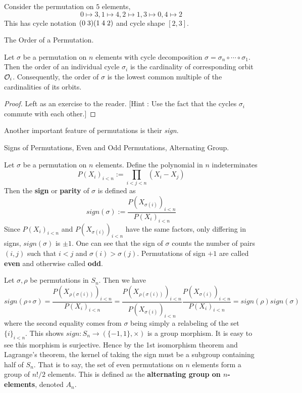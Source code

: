 \documentclass[../../book.tex]{subfiles}
\begin{document}
\begin{eg}
    
    Consider the permutation on $5$ elements, \[
        0 \mapsto 3, 1 \mapsto 4, 2 \mapsto 1, 3 \mapsto 0, 4 \mapsto 2
    \]
    This has cycle notation $(0\thickspace3) (1\thickspace4\thickspace2)$
    and cycle shape $[2, 3]$. 
    
\end{eg}

\begin{thm} The Order of a Permutation. 
    
    Let $\sigma$ be a permutation on $n$ elements 
    with cycle decomposition $\sigma = \sigma_n \circ \cdots \circ \sigma_1$. 
    Then the order of an individual cycle $\sigma_i$ is 
    the cardinality of corresponding orbit $\mathcal{O}_i$.
    Consequently, the order of $\sigma$ is the lowest common multiple
    of the cardinalities of its orbits. 

\end{thm}
\begin{proof}
    
    Left as an exercise to the reader. 
    [Hint : Use the fact that the cycles $\sigma_i$ commute with each other.]
    
\end{proof}

Another important feature of permutations is their \emph{sign}. 

\begin{dfn} Signs of Permutations, Even and Odd Permutations, Alternating Group. 
    
    Let $\sigma$ be a permutation on $n$ elements. 
    Define the polynomial in $n$ indeterminates
    \[
        P(X_i)_{i<n} := \prod_{i<j<n} (X_i - X_j)
    \]
    Then the \textbf{sign} or \textbf{parity} of $\sigma$ is defined as \[
        sign(\sigma) := \frac{P(X_{\sigma(i)})_{i<n}}{P(X_i)_{i<n}}
    \]
    Since $P(X_i)_{i<n}$ and $P(X_{\sigma(i)})_{i<n}$ have the same factors,
    only differing in signs, $sign(\sigma)$ is $\pm 1$. 
    One can see that the sign of $\sigma$ counts
    the number of pairs $(i,j)$ such that $i < j$ and $\sigma(i) > \sigma(j)$. 
    Permutations of sign $+1$ are called \textbf{even} 
    and otherwise called \textbf{odd}.
    
    Let $\sigma, \rho$ be permutations in $S_n$. 
    Then we have \[
        sign(\rho \circ \sigma) = \frac{P(X_{\rho(\sigma(i))})_{i<n}}{P(X_i)_{i<n}}
        = \frac{P(X_{\rho(\sigma(i))})_{i<n}}{P(X_{\sigma(i)})_{i<n}}
        \frac{P(X_{\sigma(i)})_{i<n}}{P(X_i)_{i<n}} 
        = sign(\rho) sign(\sigma)
    \]
    where the second equality comes from $\sigma$ being simply
    a relabeling of the set $\{i\}_{i<n}$. 
    This shows $sign : S_n \to (\{-1,1\},\times)$ is a group morphism. 
    It is easy to see this morphism is surjective. 
    Hence by the 1st isomorphism theorem and Lagrange's theorem, 
    the kernel of taking the sign must be a subgroup containing half of $S_n$. 
    That is to say, the set of even permutations on $n$ elements
    form a group of $n!/2$ elements.
    This is defined as the \textbf{alternating group on $n$-elements}, denoted $A_n$.
\end{dfn}
\end{document}
